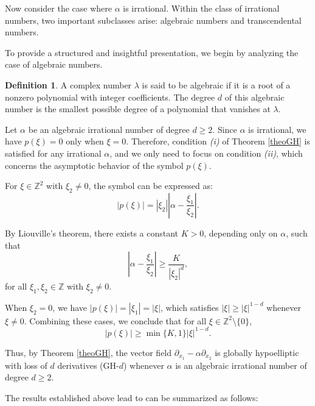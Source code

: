 \documentclass[11pt]{amsart}
\numberwithin{equation}{section}
\theoremstyle{definition}
\newtheorem{definition}[theorem]{Definition}
\begin{document}
	Now consider the case where \( \alpha \) is irrational. Within the class of irrational numbers, two important subclasses arise: algebraic numbers and transcendental numbers. 
	
	To provide a structured and insightful presentation, we begin by analyzing the case of algebraic numbers.
	
	\begin{definition}
		A complex number \( \lambda \) is said to be algebraic if it is a root of a nonzero polynomial with integer coefficients. The degree \( d \) of this algebraic number is the smallest possible degree of a polynomial that vanishes at \( \lambda \).
	\end{definition}

	Let \( \alpha \) be an algebraic irrational number of degree \( d \geq 2 \). Since \( \alpha \) is irrational, we have \( p(\xi) = 0 \) only when \( \xi = 0 \). Therefore, condition {\it (i)} of Theorem \ref{theoGH} is satisfied for any irrational \( \alpha \), and we only need to focus on condition {\it (ii)}, which concerns the asymptotic behavior of the symbol \( p(\xi) \).
	
	For \( \xi \in \mathbb{Z}^2 \) with \( \xi_2 \neq 0 \), the symbol can be expressed as:
	\begin{equation}\label{symbol-vf} 
		|p(\xi)| = |\xi_2| \left| \alpha - \frac{\xi_1}{\xi_2} \right|.
	\end{equation}
	
	By Liouville's theorem, there exists a constant \( K > 0 \), depending only on \( \alpha \), such that
	\[
	\left| \alpha - \frac{\xi_1}{\xi_2} \right| \geq \frac{K}{|\xi_2|^d},
	\]
	for all \( \xi_1, \xi_2 \in \mathbb{Z} \) with \( \xi_2 \neq 0 \). 
	
	When \( \xi_2 = 0 \), we have \( |p(\xi)| = |\xi_1| = |\xi| \), which satisfies \( |\xi| \geq |\xi|^{1-d} \) whenever \( \xi \neq 0 \). Combining these cases, we conclude that for all \( \xi \in \mathbb{Z}^2 \setminus \{0\} \),
	\[
	|p(\xi)| \geq \min\{K, 1\} |\xi|^{1-d}.
	\]
	
	Thus, by Theorem \ref{theoGH}, the vector field \( \partial_{x_1} - \alpha \partial_{x_2} \) is globally hypoelliptic with loss of \( d \) derivatives (GH-\( d \)) whenever \( \alpha \) is an algebraic irrational number of degree \( d \geq 2 \).
	
	The results established above lead to can be summarized as follows:
	
\end{document}
